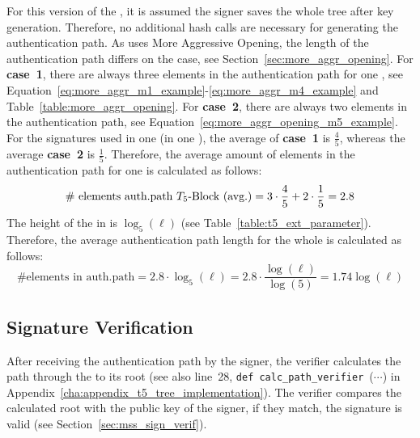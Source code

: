 For this version of the \extree, it is assumed the signer saves the whole tree  after key generation. Therefore, no additional hash calls are necessary for generating the authentication path. %
As \extree uses More Aggressive Opening, the length of the authentication path differs on the case, see Section~\ref{sec:more_aggr_opening}.
For \textbf{case~1}, there are always three elements in the authentication path for one \tfblock, see Equation~\ref{eq:more_aggr_m1_example}-\ref{eq:more_aggr_m4_example} and Table~\ref{table:more_aggr_opening}.
For \textbf{case~2}, there are always two elements in the authentication path, see Equation~\ref{eq:more_aggr_opening_m5_example}. For the signatures used in one \tfblock (in one \extree), the average of \textbf{case~1} is $\frac{4}{5}$, whereas the average \textbf{case~2} is $\frac{1}{5}$.
Therefore, the average amount of elements in the authentication path for one \tfblock is calculated as follows:
\begin{equation}
\label{eq:more_aggr_len_authpath}
\text{\# elements auth.path \tfblock (avg.)} = 3 \cdot \frac{4}{5} + 2 \cdot \frac{1}{5} = 2.8
\end{equation}
The height of the \extree in \tfblocks is $\log_5(\ell)$ (see Table~\ref{table:t5_ext_parameter}). Therefore, the average authentication path length for the whole \extree is calculated as follows:
\begin{equation}
\label{eq:ext_t5_len_authpath}
\text{\# elements in auth.path} = 2.8 \cdot \log_5(\ell) = 2.8 \cdot \frac{\log(\ell)}{\log(5)} = 1.74\log(\ell)
\end{equation}

\subsection{\texorpdfstring{\extree}{Ext. T5-Tree} Signature Verification}
After receiving the authentication path by the signer, the verifier calculates the path through the \extree to its root (see also line~28, \texttt{def calc_path_verifier}~($\cdots$) in Appendix~\ref{cha:appendix_t5_tree_implementation}). The verifier compares the calculated root with the public key of the signer, if they match, the signature is valid (see Section~\ref{sec:mss_sign_verif}).

